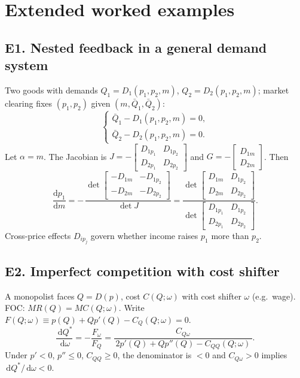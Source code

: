 \documentclass[11pt]{article}
\newcommand{\dd}{\,\mathrm{d}}
\newcommand{\dtotal}[2]{\frac{\mathrm{d} #1}{\mathrm{d} #2}}
\begin{document}
\section*{Extended worked examples}

\subsection*{E1. Nested feedback in a general demand system}
Two goods with demands $Q_1=D_1(p_1,p_2,m)$, $Q_2=D_2(p_1,p_2,m)$; market clearing fixes $(p_1,p_2)$ given $(m,\bar{Q}_1,\bar{Q}_2)$:
\[
\begin{cases}
\bar{Q}_1 - D_1(p_1,p_2,m)=0,\\
\bar{Q}_2 - D_2(p_1,p_2,m)=0.
\end{cases}
\]
Let $\alpha=m$. The Jacobian is $J=-\begin{bmatrix} D_{1p_1}&D_{1p_2}\\ D_{2p_1}&D_{2p_2}\end{bmatrix}$ and $G=-\begin{bmatrix}D_{1m}\\ D_{2m}\end{bmatrix}$. Then
\[
\dtotal{p_1}{m}
= -\,\frac{\det \begin{bmatrix} -D_{1m} & -D_{1p_2}\\ -D_{2m} & -D_{2p_2}\end{bmatrix}}{\det J}
=\frac{\det \begin{bmatrix} D_{1m} & D_{1p_2}\\ D_{2m} & D_{2p_2}\end{bmatrix}}{\det \begin{bmatrix} D_{1p_1}&D_{1p_2}\\ D_{2p_1}&D_{2p_2}\end{bmatrix}}.
\]
Cross-price effects $D_{ip_j}$ govern whether income raises $p_1$ more than $p_2$.

\subsection*{E2. Imperfect competition with cost shifter}
A monopolist faces $Q=D(p)$, cost $C(Q;\omega)$ with cost shifter $\omega$ (e.g.\ wage). FOC: $MR(Q)=MC(Q;\omega)$. Write $F(Q;\omega)\equiv p(Q)+Qp'(Q)-C_Q(Q;\omega)=0$.
\[
\frac{\dd Q^\ast}{\dd \omega} 
= -\frac{F_\omega}{F_Q}
= \frac{C_{Q\omega}}{\,2p'(Q)+Qp''(Q)-C_{QQ}(Q;\omega)\,}.
\]
Under $p'<0$, $p''\le 0$, $C_{QQ}\ge 0$, the denominator is $<0$ and $C_{Q\omega}>0$ implies $\dd Q^\ast/\dd\omega<0$.
\end{document}
